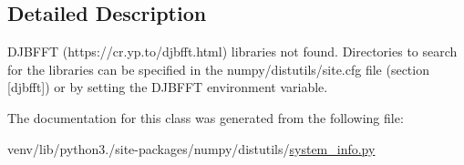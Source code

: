 \subsection{Detailed Description}
\begin{DoxyVerb}DJBFFT (https://cr.yp.to/djbfft.html) libraries not found.
Directories to search for the libraries can be specified in the
numpy/distutils/site.cfg file (section [djbfft]) or by setting
the DJBFFT environment variable.\end{DoxyVerb}
 

The documentation for this class was generated from the following file\+:\begin{DoxyCompactItemize}
\item 
venv/lib/python3./site-\/packages/numpy/distutils/\hyperlink{system__info_8py}{system\+\_\+info.\+py}\end{DoxyCompactItemize}
